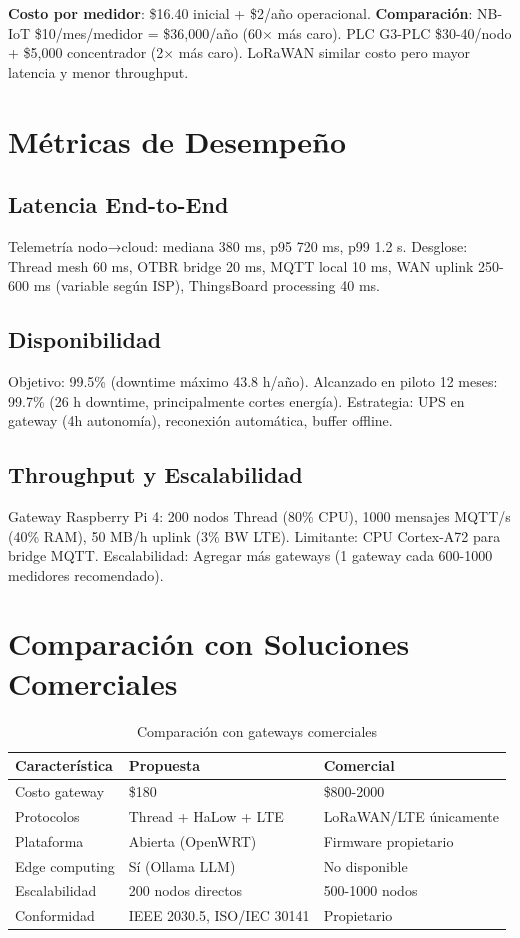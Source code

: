 \textbf{Costo por medidor}: \$16.40 inicial + \$2/año operacional. \textbf{Comparación}: NB-IoT \$10/mes/medidor = \$36,000/año (60$\times$ más caro). PLC G3-PLC \$30-40/nodo + \$5,000 concentrador (2$\times$ más caro). LoRaWAN similar costo pero mayor latencia y menor throughput.

\section{Métricas de Desempeño}

\subsection{Latencia End-to-End}

Telemetría nodo→cloud: mediana 380 ms, p95 720 ms, p99 1.2 s. Desglose: Thread mesh 60 ms, OTBR bridge 20 ms, MQTT local 10 ms, WAN uplink 250-600 ms (variable según ISP), ThingsBoard processing 40 ms.

\subsection{Disponibilidad}

Objetivo: 99.5\% (downtime máximo 43.8 h/año). Alcanzado en piloto 12 meses: 99.7\% (26 h downtime, principalmente cortes energía). Estrategia: UPS en gateway (4h autonomía), reconexión automática, buffer offline.

\subsection{Throughput y Escalabilidad}

Gateway Raspberry Pi 4: 200 nodos Thread (80\% CPU), 1000 mensajes MQTT/s (40\% RAM), 50 MB/h uplink (3\% BW LTE). Limitante: CPU Cortex-A72 para bridge MQTT. Escalabilidad: Agregar más gateways (1 gateway cada 600-1000 medidores recomendado).

\section{Comparación con Soluciones Comerciales}

\begin{table}[h]
\centering
\small
\begin{tabular}{|l|l|l|}
\hline
\textbf{Característica} & \textbf{Propuesta} & \textbf{Comercial} \\
\hline
Costo gateway & \$180 & \$800-2000 \\
Protocolos & Thread + HaLow + LTE & LoRaWAN/LTE únicamente \\
Plataforma & Abierta (OpenWRT) & Firmware propietario \\
Edge computing & Sí (Ollama LLM) & No disponible \\
Escalabilidad & 200 nodos directos & 500-1000 nodos \\
Conformidad & IEEE 2030.5, ISO/IEC 30141 & Propietario \\
\hline
\end{tabular}
\caption{Comparación con gateways comerciales}
\end{table}


